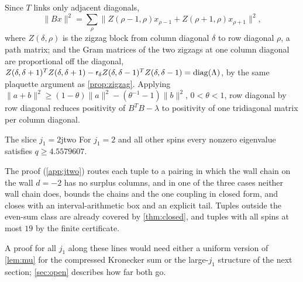 Since $T$ links only adjacent diagonals,
\[
  \|Bx\|^2=\sum_\rho\bigl\|Z(\rho-1,\rho)x_{\rho-1}+Z(\rho+1,\rho)x_{\rho+1}\bigr\|^2,
\]
where $Z(\delta,\rho)$ is the zigzag block from column diagonal $\delta$ to row diagonal
$\rho$, a path matrix; and the Gram matrices of the two zigzags at one column diagonal
are proportional off the diagonal, $Z(\delta,\delta+1)^TZ(\delta,\delta+1)-\mathsf r_\delta
Z(\delta,\delta-1)^TZ(\delta,\delta-1)=\operatorname{diag}(\Lambda)$, by the same plaquette argument
as \cref{prop:zigzag}. Applying $\|a+b\|^2\ge(1-\theta)\|a\|^2-(\theta^{-1}-1)\|b\|^2$,
$0<\theta<1$, row diagonal by row diagonal reduces positivity of $B^TB-\lambda$ to
positivity of one tridiagonal matrix per column diagonal.

\begin{theorem}{The slice \texorpdfstring{$j_1=2$}{j1 = 2}}{jtwo}
For $j_1=2$ and all other spins every nonzero eigenvalue satisfies $q\ge4.5579607$.
\end{theorem}

The proof (\cref{app:jtwo}) routes each tuple to a pairing in which the wall chain on the
wall $d=-2$ has no surplus columns, and in one of the three cases neither wall chain does, bounds the chains and the one coupling in closed form, and closes
with an interval-arithmetic box and an explicit tail. Tuples outside the even-sum class
are already covered by \cref{thm:closed}, and tuples with all spins at most $19$ by the
finite certificate.

A proof for all $j_1$ along these lines would need either a uniform version of
\cref{lem:mu} for the compressed Kronecker sum or the large-$j_1$ structure of the next
section; \cref{sec:open} describes how far both go.
